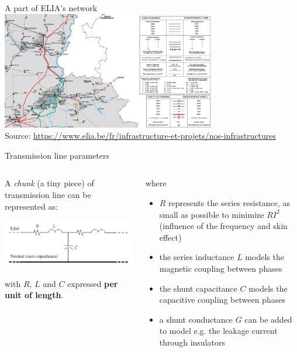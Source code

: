 \begin{frame}{A part of ELIA's network}
    \centering
    \includegraphics[width=0.7\textwidth]{images/carte_ELIA_2019_Liege.png}\\
    Source: \href{https://www.elia.be/fr/infrastructure-et-projets/nos-infrastructures}{https://www.elia.be/fr/infrastructure-et-projets/nos-infrastructures}
\end{frame}

\begin{frame}{Transmission line parameters}
\begin{columns}
    \begin{column}{0.5\textwidth}
    A \textit{chunk} (a tiny piece)  of transmission line can be represented as:
    \begin{center}
        \includegraphics[width=\textwidth]{images/TL_1.png}
    \end{center}
    with $R$, $L$ and $C$ expressed \textbf{per unit of length}.
    \end{column}
    \begin{column}{0.5\textwidth}
    where
    \begin{itemize}
        \item $R$ represents the series resistance, as small as possible to minimize $RI^2$ (influence of the frequency and skin effect)
        \item the series inductance $L$ models the magnetic coupling between phases
        \item the shunt capacitance $C$ models the capacitive coupling between phases
        \item a shunt conductance $G$ can be added to model e.g. the leakage current through insulators
    \end{itemize}
    \end{column}
\end{columns}
    

\end{frame}

